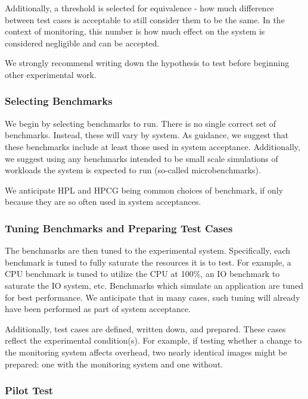 \documentclass[conference]{IEEEtran}
\begin{document}
Additionally, a threshold is selected for equivalence - how much difference 
between test cases is acceptable to still consider them to be the same. In the 
context of monitoring, this number is how much effect on the system is 
considered negligible and can be accepted.

We strongly recommend writing down the hypothesis to test before beginning 
other experimental work.

\subsubsection{Selecting Benchmarks}

We begin by selecting benchmarks to run. There is no single correct set of 
benchmarks. Instead, these will vary by system. As guidance, we suggest that 
these benchmarks include at least those used in system acceptance. Additionally, 
we suggest using any benchmarks intended to be small scale simulations of 
workloads the system is expected to run (so-called microbenchmarks).

We anticipate HPL\cite{dongarraLINPACKBenchmarkPresent2003} and 
HPCG\cite{herouxNewMetricRanking2013} being common choices of benchmark, if 
only because they are so often used in system acceptances.

\subsubsection{Tuning Benchmarks and Preparing Test Cases}

The benchmarks are then tuned to the experimental system. Specifically, each 
benchmark is tuned to fully saturate the resources it is to test. For example, a 
CPU benchmark is tuned to utilize the CPU at 100\%, an IO benchmark to saturate 
the IO system, etc. Benchmarks which simulate an application are tuned for best 
performance. We anticipate that in many cases, such tuning will already have 
been performed as part of system acceptance.

Additionally, test cases are defined, written down, and prepared. These cases 
reflect the experimental 
condition(s). For example, if testing whether a change to the monitoring system 
affects overhead, two nearly identical images might be prepared: one with 
the monitoring system and one without.

\subsubsection{Pilot Test}
\end{document}
